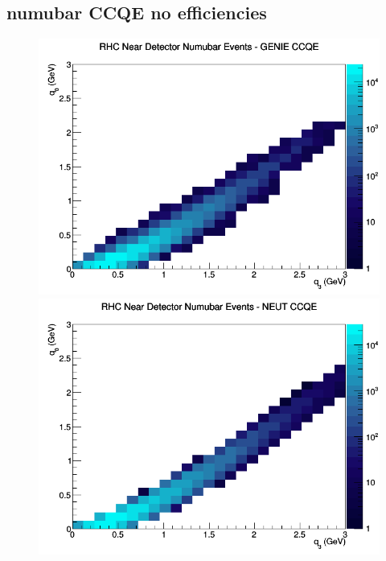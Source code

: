 \documentclass[12pt]{article}
\begin{document}
\subsection{numubar CCQE no efficiencies}
\begin{figure}[h]
\includegraphics[width=\linewidth]{q0_q3/nominal/CCQE_RHC_ND_numubar_q3_q0_GENIE.png}
\endminipage
{}
\includegraphics[width=\linewidth]{q0_q3/nominal/CCQE_RHC_ND_numubar_q3_q0_NEUT.png}
\endminipage
{}

\end{figure}
\end{document}
